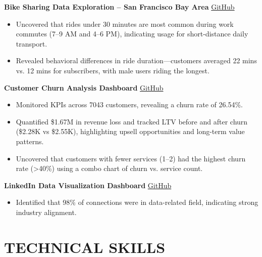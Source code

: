 \documentclass[11pt]{article}
\begin{document}
\textbf{Bike Sharing Data Exploration – San Francisco Bay Area} \hfill \href{https://github.com/Mostafa-Elnagar/bikesharing_project}{GitHub}
\begin{itemize}
\item Uncovered that rides under 30 minutes are most common during work commutes (7–9 AM and 4–6 PM), indicating usage for short-distance daily transport.
\item Revealed behavioral differences in ride duration—customers averaged 22 mins vs. 12 mins for subscribers, with male users riding the longest.\\
\end{itemize}

\textbf{Customer Churn Analysis Dashboard} \hfill \href{https://github.com/Mostafa-Elnagar/ChurnAnalysisDashboard}{GitHub}
\begin{itemize}
\item Monitored KPIs across 7043 customers, revealing a churn rate of 26.54\%.
\item Quantified \$1.67M in revenue loss and tracked LTV before and after churn (\$2.28K vs \$2.55K), highlighting upsell opportunities and long-term value patterns.
\item Uncovered that customers with fewer services (1–2) had the highest churn rate (>40\%) using a combo chart of churn vs. service count.\\
\end{itemize}

\textbf{LinkedIn Data Visualization Dashboard} \hfill \href{https://github.com/Mostafa-Elnagar/linkedin-dashboard}{GitHub}
\begin{itemize}
  \item Identified that 98\% of connections were in data-related field, indicating strong industry alignment.
\end{itemize}

\section{TECHNICAL SKILLS}
\end{document}
